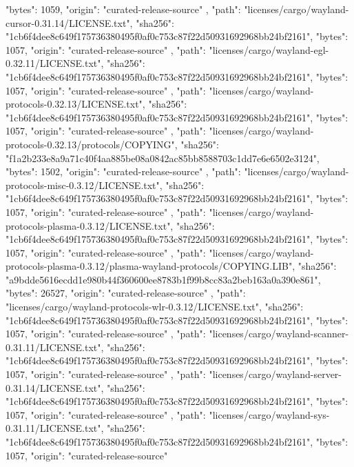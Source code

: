 {{      "bytes": 1059,
      "origin": "curated-release-source"
    },
    {
      "path": "licenses/cargo/wayland-cursor-0.31.14/LICENSE.txt",
      "sha256": "1cb6f4dee8c649f175736380495f0af0c753c87f22d50931692968bb24bf2161",
      "bytes": 1057,
      "origin": "curated-release-source"
    },
    {
      "path": "licenses/cargo/wayland-egl-0.32.11/LICENSE.txt",
      "sha256": "1cb6f4dee8c649f175736380495f0af0c753c87f22d50931692968bb24bf2161",
      "bytes": 1057,
      "origin": "curated-release-source"
    },
    {
      "path": "licenses/cargo/wayland-protocols-0.32.13/LICENSE.txt",
      "sha256": "1cb6f4dee8c649f175736380495f0af0c753c87f22d50931692968bb24bf2161",
      "bytes": 1057,
      "origin": "curated-release-source"
    },
    {
      "path": "licenses/cargo/wayland-protocols-0.32.13/protocols/COPYING",
      "sha256": "f1a2b233e8a9a71c40f4aa885be08a0842ac85bb8588703c1dd7e6e6502e3124",
      "bytes": 1502,
      "origin": "curated-release-source"
    },
    {
      "path": "licenses/cargo/wayland-protocols-misc-0.3.12/LICENSE.txt",
      "sha256": "1cb6f4dee8c649f175736380495f0af0c753c87f22d50931692968bb24bf2161",
      "bytes": 1057,
      "origin": "curated-release-source"
    },
    {
      "path": "licenses/cargo/wayland-protocols-plasma-0.3.12/LICENSE.txt",
      "sha256": "1cb6f4dee8c649f175736380495f0af0c753c87f22d50931692968bb24bf2161",
      "bytes": 1057,
      "origin": "curated-release-source"
    },
    {
      "path": "licenses/cargo/wayland-protocols-plasma-0.3.12/plasma-wayland-protocols/COPYING.LIB",
      "sha256": "a9bdde5616ecdd1e980b44f360600ee8783b1f99b8cc83a2beb163a0a390e861",
      "bytes": 26527,
      "origin": "curated-release-source"
    },
    {
      "path": "licenses/cargo/wayland-protocols-wlr-0.3.12/LICENSE.txt",
      "sha256": "1cb6f4dee8c649f175736380495f0af0c753c87f22d50931692968bb24bf2161",
      "bytes": 1057,
      "origin": "curated-release-source"
    },
    {
      "path": "licenses/cargo/wayland-scanner-0.31.11/LICENSE.txt",
      "sha256": "1cb6f4dee8c649f175736380495f0af0c753c87f22d50931692968bb24bf2161",
      "bytes": 1057,
      "origin": "curated-release-source"
    },
    {
      "path": "licenses/cargo/wayland-server-0.31.14/LICENSE.txt",
      "sha256": "1cb6f4dee8c649f175736380495f0af0c753c87f22d50931692968bb24bf2161",
      "bytes": 1057,
      "origin": "curated-release-source"
    },
    {
      "path": "licenses/cargo/wayland-sys-0.31.11/LICENSE.txt",
      "sha256": "1cb6f4dee8c649f175736380495f0af0c753c87f22d50931692968bb24bf2161",
      "bytes": 1057,
      "origin": "curated-release-source"
}}

